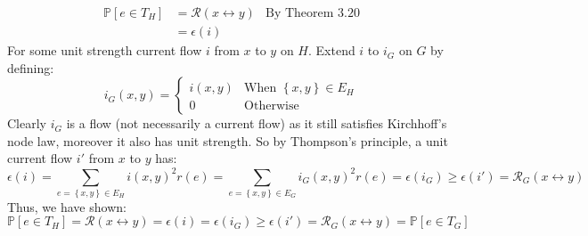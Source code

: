 \documentclass[a4paper, 11pt]{article}
\def\set#1{\left\{ #1 \right\}}
\begin{document}
\begin{align*}
	\mathbb{P}[e\in T_H] & = \mathcal{R}(x \leftrightarrow y) & \text{By Theorem 3.20} \\
	                     & = \epsilon(i)
\end{align*}
For some unit strength current flow $i$ from $x$ to $y$ on $H$. Extend $i$ to $i_G$ on $G$ by defining:
\[
	i_G(x,y) = \begin{cases}
		i(x,y) & \text{When $\set{x,y}\in E_H$} \\
		0      & \text{Otherwise}
	\end{cases}
\]
Clearly $i_G$ is a flow (not necessarily a current flow) as it still satisfies Kirchhoff's node law, moreover it also has unit strength. So by Thompson's principle, a unit current flow $i'$ from $x$ to $y$ has:
$$\epsilon(i)=\sum_{e=\set{x,y}\in E_H}i(x,y)^2r(e)
=\sum_{e=\set{x,y}\in E_G}i_G(x,y)^2r(e)
=\epsilon(i_G)\geq \epsilon(i')=\mathcal{R}_G(x\leftrightarrow y)$$
Thus, we have shown:
\[
	\mathbb{P}[e\in T_H]  = \mathcal{R}(x \leftrightarrow y) = \epsilon(i)=\epsilon(i_G)\geq \epsilon(i')=\mathcal{R}_G(x\leftrightarrow y) = \mathbb{P}[e\in T_G]
\]
\end{document}
